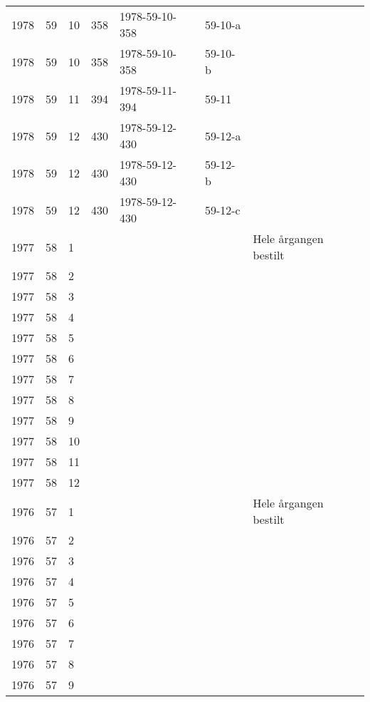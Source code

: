\begin{longtable}{ |l|l|l|l|p{2.7cm}|l|p{2cm}| }
 1978 & 59 &    10 &     358 & 1978-59-10-358 & 59-10-a & \\
 1978 & 59 &    10 &     358 & 1978-59-10-358 & 59-10-b & \\
 1978 & 59 &    11 &     394 & 1978-59-11-394 & 59-11 & \\
 1978 & 59 &    12 &     430 & 1978-59-12-430 & 59-12-a & \\
 1978 & 59 &    12 &     430 & 1978-59-12-430 & 59-12-b & \\
 1978 & 59 &    12 &     430 & 1978-59-12-430 & 59-12-c & \\
 1977 & 58 &     1 &         &                &  & Hele årgangen bestilt \\
 1977 & 58 &     2 &         &                &  & \\
 1977 & 58 &     3 &         &                &  & \\
 1977 & 58 &     4 &         &                &  & \\
 1977 & 58 &     5 &         &                &  & \\
 1977 & 58 &     6 &         &                &  & \\
 1977 & 58 &     7 &         &                &  & \\
 1977 & 58 &     8 &         &                &  & \\
 1977 & 58 &     9 &         &                &  & \\
 1977 & 58 &    10 &         &                &  & \\
 1977 & 58 &    11 &         &                &  & \\
 1977 & 58 &    12 &         &                &  & \\
 1976 & 57 &     1 &         &                &  & Hele årgangen bestilt\\
 1976 & 57 &     2 &         &                &  & \\
 1976 & 57 &     3 &         &                &  & \\
 1976 & 57 &     4 &         &                &  & \\
 1976 & 57 &     5 &         &                &  & \\
 1976 & 57 &     6 &         &                &  & \\
 1976 & 57 &     7 &         &                &  & \\
 1976 & 57 &     8 &         &                &  & \\
 1976 & 57 &     9 &         &                &  & \\

\end{longtable}
